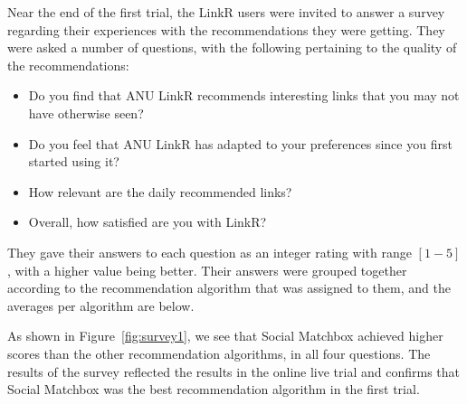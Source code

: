 Near the end of the first trial, the LinkR users were invited to answer a survey regarding their experiences with the recommendations they were getting. They were asked a number of questions, with the following pertaining to the quality of the recommendations:

\begin{itemize}
\item{Do you find that ANU LinkR recommends interesting links that you may not have otherwise seen?}
\item{Do you feel that ANU LinkR has adapted to your preferences since you first started using it?}
\item{How relevant are the daily recommended links?}
\item{Overall, how satisfied are you with LinkR?}
\end{itemize}

They gave their answers to each question as an integer rating with range $[1-5]$, with a higher value being better. Their answers were grouped together according to the recommendation algorithm that was assigned to them, and the averages per algorithm are below.

As shown in Figure~\ref{fig:survey1}, we see that Social Matchbox achieved higher scores than the other recommendation algorithms, in all four questions. The results of the survey reflected the results in the online live trial and confirms that Social Matchbox was the best recommendation algorithm in the first trial.
 
